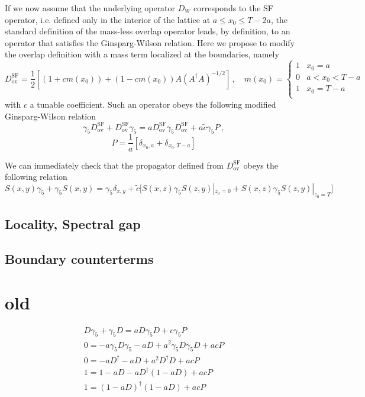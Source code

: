 \documentclass[a4paper]{scrartcl}
\def\Dov{D_\mathrm{ov}}
\def\Dovsf{\Dov^\mathrm{SF}}
\begin{document}
If we now assume that the underlying operator $D_W$ corresponds to 
the SF operator, i.e. defined only in the interior of the 
lattice at $a \leq x_0 \leq T-2a$, the standard definition of the mass-less
overlap operator leads, by definition, to an operator that satisfies 
the Ginsparg-Wilson relation.
Here we propose to modify the overlap definition with a mass term 
localized at the boundaries, namely
\begin{equation}
\Dov^\mathrm{SF} = \frac{1}{2} [(1 + c m(x_0)) + (1-c m(x_0)) A (A^\dagger A)^{-1/2} ] \,, 
\quad m(x_0) = \left\{ \begin{array}{cl} 1 & x_0=a \\
0 & a<x_0<T-a \\
1 & x_0=T-a\\
\end{array} \right.
\end{equation}
with $c$ a tunable coefficient.
Such an operator obeys the following modified Ginsparg-Wilson relation
\begin{equation}
\gamma_5 \Dovsf + \Dovsf \gamma_5 = a \Dovsf \gamma_5 \Dovsf + a \tilde c \gamma_5 P \,,
\end{equation}
\begin{equation}
P = \frac{1}{a} [\delta_{x_0,a} + \delta_{x_0,T-a}]
\end{equation}

We can immediately check that the propagator defined from $\Dovsf$ 
obeys the following relation
\begin{equation}
S(x,y) \gamma_5  + \gamma_5 S(x,y) = \gamma_5 \delta_{x,y} + 
\tilde c \big[ S (x,z) \gamma_5 S(z,y)|_{z_0=0}  
+ S (x,z) \gamma_5 S(z,y)|_{z_0=T} \big]
\end{equation}

\subsection{Locality, Spectral gap}

\subsection{Boundary counterterms}

\section{old}


\begin{equation}
\begin{gathered}
D \gamma_5 + \gamma_5 D = a D \gamma_5 D + c \gamma_5 P \\
0 = - a \gamma_5 D \gamma_5 - a D + a^2 \gamma_5 D \gamma_5 D + a c P \\
0 = - a D^\dagger - a D + a^2 D^\dagger D + a c P \\
1 = 1 - a D - a D^\dagger (1-aD) + a c P \\
1 = (1-aD)^\dagger (1-aD) + ac P \\
\end{gathered}
\end{equation}
\end{document}
